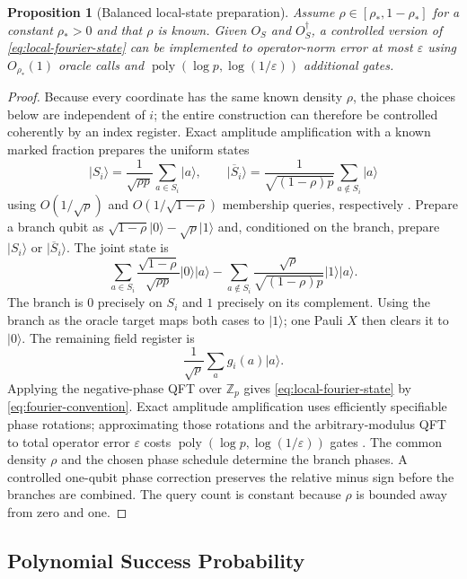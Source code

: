 \documentclass[11pt,letterpaper]{article}
\newtheorem{proposition}[theorem]{Proposition}
\theoremstyle{definition}
\newcommand{\poly}{\operatorname{poly}}
\newcommand{\ket}[1]{\lvert #1\rangle}
\begin{document}
\begin{proposition}[Balanced local-state preparation]
\label{prop:membership-to-fourier}
Assume $\rho\in[\rho_*,1-\rho_*]$ for a constant $\rho_*>0$ and that $\rho$ is known.  Given $O_S$ and $O_S^\dagger$, a controlled version of \cref{eq:local-fourier-state} can be implemented to operator-norm error at most $\varepsilon$ using $O_{\rho_*}(1)$ oracle calls and $\poly(\log p,\log(1/\varepsilon))$ additional gates.
\end{proposition}

\begin{proof}
Because every coordinate has the same known density $\rho$, the phase choices below are independent of $i$; the entire construction can therefore be controlled coherently by an index register.  Exact amplitude amplification with a known marked fraction prepares the uniform states
\[
   \ket{S_i}=\frac1{\sqrt{\rho p}}\sum_{a\in S_i}\ket{a},
   \qquad
   \ket{\overline S_i}=\frac1{\sqrt{(1-\rho)p}}\sum_{a\notin S_i}\ket{a}
\]
using $O(1/\sqrt\rho)$ and $O(1/\sqrt{1-\rho})$ membership queries, respectively \cite{BrassardEtAl2002}.  Prepare a branch qubit as
$\sqrt{1-\rho}\ket0-\sqrt\rho\ket1$ and, conditioned on the branch, prepare $\ket{S_i}$ or $\ket{\overline S_i}$.  The joint state is
\[
   \sum_{a\in S_i}\frac{\sqrt{1-\rho}}{\sqrt{\rho p}}\ket0\ket a
   -\sum_{a\notin S_i}\frac{\sqrt\rho}{\sqrt{(1-\rho)p}}\ket1\ket a.
\]
The branch is $0$ precisely on $S_i$ and $1$ precisely on its complement.  Using the branch as the oracle target maps both cases to $\ket1$; one Pauli $X$ then clears it to $\ket0$.  The remaining field register is
\[
   \frac1{\sqrt p}\sum_a g_i(a)\ket a.
\]
Applying the negative-phase QFT over $\mathbb Z_p$ gives \cref{eq:local-fourier-state} by \cref{eq:fourier-convention}.  Exact amplitude amplification uses efficiently specifiable phase rotations; approximating those rotations and the arbitrary-modulus QFT to total operator error $\varepsilon$ costs $\poly(\log p,\log(1/\varepsilon))$ gates \cite{HalesHallgren2000}.  The common density $\rho$ and the chosen phase schedule determine the branch phases.  A controlled one-qubit phase correction preserves the relative minus sign before the branches are combined.  The query count is constant because $\rho$ is bounded away from zero and one.
\end{proof}

\subsection{Polynomial Success Probability}
\end{document}
